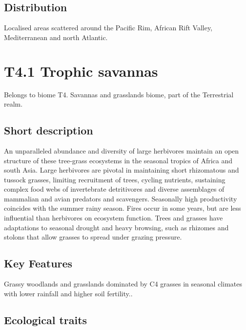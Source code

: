 \documentclass[
  letterpaper,
  DIV=11,
  numbers=noendperiod]{scrartcl}
\begin{document}
\subsection{Distribution}\label{distribution-82}

Localised areas scattered around the Pacific Rim, African Rift Valley,
Mediterranean and north Atlantic.

\section{T4.1 Trophic savannas}\label{t4.1-trophic-savannas}

Belongs to biome T4. Savannas and grasslands biome, part of the
Terrestrial realm.

\subsection{Short description}\label{short-description-83}

An unparalleled abundance and diversity of large herbivores maintain an
open structure of these tree-grass ecosystems in the seasonal tropics of
Africa and south Asia. Large herbivores are pivotal in maintaining short
rhizomatous and tussock grasses, limiting recruitment of trees, cycling
nutrients, sustaining complex food webs of invertebrate detritivores and
diverse assemblages of mammalian and avian predators and scavengers.
Seasonally high productivity coincides with the summer rainy season.
Fires occur in some years, but are less influential than herbivores on
ecosystem function. Trees and grasses have adaptations to seasonal
drought and heavy browsing, such as rhizomes and stolons that allow
grasses to spread under grazing pressure.

\subsection{Key Features}\label{key-features-83}

Grassy woodlands and grasslands dominated by C4 grasses in seasonal
climates with lower rainfall and higher soil fertility..

\subsection{Ecological traits}\label{ecological-traits-83}
\end{document}
